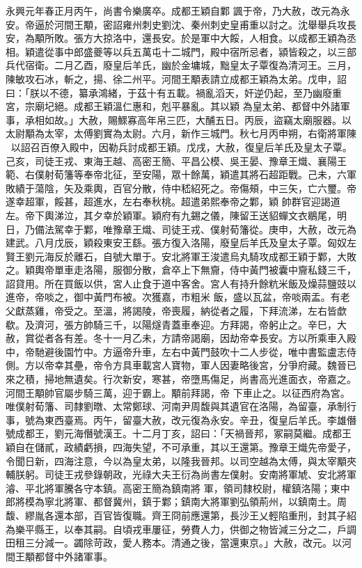\begin{pinyinscope}
 永興元年春正月丙午，尚書令樂廣卒。成都王穎自鄴
 諷于帝，乃大赦，改元為永安。帝逼於河間王顒，密詔雍州刺史劉沈、秦州刺史皇甫重以討之。沈舉舉兵攻長安，為顒所敗。張方大掠洛中，還長安。於是軍中大餒，人相食。以成都王穎為丞相。穎遣從事中郎盛夔等以兵五萬屯十二城門，殿中宿所忌者，潁皆殺之，以三部兵代宿衛。二月乙酉，廢皇后羊氏，幽於金墉城，黜皇太子覃復為清河王。三月，陳敏攻石冰，斬之，揚、徐二州平。河間王顒表請立成都王穎為太弟。戊申，詔曰：「朕以不德，纂承鴻緒，于茲十有五載。禍亂滔天，奸逆仍起，至乃幽廢重宮，宗廟圮絕。成都王穎溫仁惠和，剋平暴亂。其以穎
 為皇太弟、都督中外諸軍事，承相如故。」大赦，賜鰥寡高年帛三匹，大酺五日。丙辰，盜竊太廟服器。以太尉顒為太宰，太傅劉實為太尉。六月，新作三城門。秋七月丙申朔，右衛將軍陳以詔召百僚入殿中，因勒兵討成都王穎。戊戌，大赦，復皇后羊氏及皇太子覃。己亥，司徒王戎、東海王越、高密王簡、平昌公模、吳王晏、豫章王熾、襄陽王範、右僕射荀籓等奉帝北征，至安陽，眾十餘萬，穎遣其將石超距戰。己未，六軍敗績于蕩陰，矢及乘輿，百官分散，侍中嵇紹死之。帝傷頰，中三矢，亡六璽。帝遂幸超軍，餒甚，超進水，左右奉秋桃。超遣弟熙奉帝之鄴，穎
 帥群官迎謁道左。帝下輿涕泣，其夕幸於穎軍。穎府有九錫之儀，陳留王送貂蟬文衣鶡尾，明日，乃備法駕幸于鄴，唯豫章王熾、司徒王戎、僕射荀籓從。庚申，大赦，改元為建武。八月戊辰，穎殺東安王繇。張方復入洛陽，廢皇后羊氏及皇太子覃。匈奴左賢王劉元海反於離石，自號大單于。安北將軍王浚遣烏丸騎攻成都王穎于鄴，大敗之。穎輿帝單車走洛陽，服御分散，倉卒上下無齎，侍中黃門被囊中齎私錢三千，詔貸用。所在買飯以供，宮人止食于道中客舍。宮人有持升餘粇米飯及燥蒜鹽豉以進帝，帝啖之，御中黃門布被。次獲嘉，市粗米
 飯，盛以瓦盆，帝啖兩盂。有老父獻蒸雞，帝受之。至溫，將謁陵，帝喪履，納從者之履，下拜流涕，左右皆歔欷。及濟河，張方帥騎三千，以陽燧青蓋車奉迎。方拜謁，帝躬止之。辛巳，大赦，賞從者各有差。冬十一月乙未，方請帝謁廟，因劫帝幸長安。方以所乘車入殿中，帝馳避後園竹中。方逼帝升車，左右中黃門鼓吹十二人步從，唯中書監盧志侍側。方以帝幸其壘，帝令方具車載宮人寶物，軍人因妻略後宮，分爭府藏。魏晉已來之積，掃地無遺矣。行次新安，寒甚，帝墮馬傷足，尚書高光進面衣，帝嘉之。河間王顒帥官屬步騎三萬，迎于霸上。顒前拜謁，帝
 下車止之。以征西府為宮。唯僕射荀籓、司隸劉暾、太常鄭球、河南尹周馥與其遺官在洛陽，為留臺，承制行事，號為東西臺焉。丙午，留臺大赦，改元復為永安。辛丑，復皇后羊氏。李雄僭號成都王，劉元海僭號漢王。十二月丁亥，詔曰：「天禍晉邦，冢嗣莫繼。成都王穎自在儲貳，政績虧損，四海失望，不可承重，其以王還第。豫章王熾先帝愛子，令聞日新，四海注意，今以為皇太弟，以隆我晉邦。以司空越為太傅，與太宰顒夾輔朕躬。司徒王戎參錄朝政，光祿大夫王衍為尚書左僕射。安南將軍虓、安北將軍濬、平北將軍騰各守本鎮。高密王簡為鎮南將
 軍，領司隸校尉，權鎮洛陽；東中郎將模為寧北將軍、都督冀州，鎮于鄴；鎮南大將軍劉弘領荊州，以鎮南土。周馥、繆胤各還本部，百官皆復職。齊王冏前應還第，長沙王乂輕陷重刑，封其子紹為樂平縣王，以奉其嗣。自頃戎車屢征，勞費人力，供御之物皆減三分之二，戶調田租三分減一。蠲除苛政，愛人務本。清通之後，當還東京。」大赦，改元。以河間王顒都督中外諸軍事。




\end{pinyinscope}
